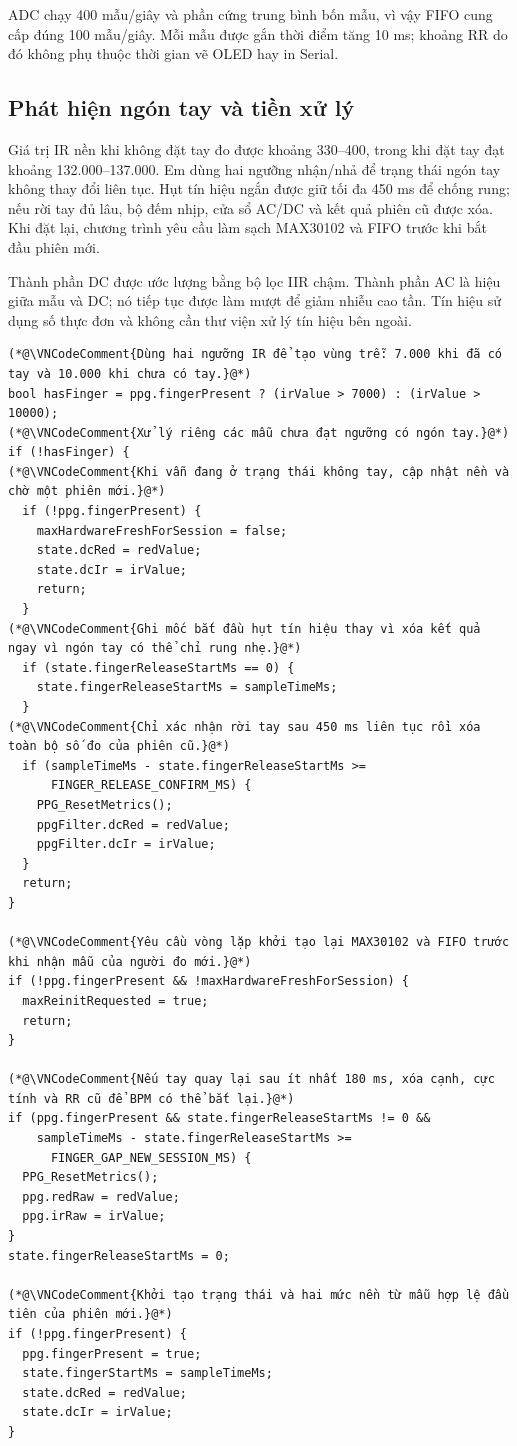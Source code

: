 \documentclass[12pt]{article}
\begin{document}
ADC chạy 400 mẫu/giây và phần cứng trung bình bốn mẫu, vì vậy FIFO cung cấp đúng 100 mẫu/giây. Mỗi mẫu được gắn thời điểm tăng 10 ms; khoảng RR do đó không phụ thuộc thời gian vẽ OLED hay in Serial.

\subsection{Phát hiện ngón tay và tiền xử lý}

Giá trị IR nền khi không đặt tay đo được khoảng 330--400, trong khi đặt tay đạt khoảng 132.000--137.000. Em dùng hai ngưỡng nhận/nhả để trạng thái ngón tay không thay đổi liên tục. Hụt tín hiệu ngắn được giữ tối đa 450 ms để chống rung; nếu rời tay đủ lâu, bộ đếm nhịp, cửa sổ AC/DC và kết quả phiên cũ được xóa. Khi đặt lại, chương trình yêu cầu làm sạch MAX30102 và FIFO trước khi bắt đầu phiên mới.

Thành phần DC được ước lượng bằng bộ lọc IIR chậm. Thành phần AC là hiệu giữa mẫu và DC; nó tiếp tục được làm mượt để giảm nhiễu cao tần. Tín hiệu sử dụng số thực đơn và không cần thư viện xử lý tín hiệu bên ngoài.

\Needspace{0.38\textheight}
\begin{lstlisting}[style=firmware,caption={Ngưỡng trễ, xác nhận rời tay và khởi tạo phiên đo mới}]
(*@\VNCodeComment{Dùng hai ngưỡng IR để tạo vùng trễ: 7.000 khi đã có tay và 10.000 khi chưa có tay.}@*)
bool hasFinger = ppg.fingerPresent ? (irValue > 7000) : (irValue > 10000);
(*@\VNCodeComment{Xử lý riêng các mẫu chưa đạt ngưỡng có ngón tay.}@*)
if (!hasFinger) {
(*@\VNCodeComment{Khi vẫn đang ở trạng thái không tay, cập nhật nền và chờ một phiên mới.}@*)
  if (!ppg.fingerPresent) {
    maxHardwareFreshForSession = false;
    state.dcRed = redValue;
    state.dcIr = irValue;
    return;
  }
(*@\VNCodeComment{Ghi mốc bắt đầu hụt tín hiệu thay vì xóa kết quả ngay vì ngón tay có thể chỉ rung nhẹ.}@*)
  if (state.fingerReleaseStartMs == 0) {
    state.fingerReleaseStartMs = sampleTimeMs;
  }
(*@\VNCodeComment{Chỉ xác nhận rời tay sau 450 ms liên tục rồi xóa toàn bộ số đo của phiên cũ.}@*)
  if (sampleTimeMs - state.fingerReleaseStartMs >=
      FINGER_RELEASE_CONFIRM_MS) {
    PPG_ResetMetrics();
    ppgFilter.dcRed = redValue;
    ppgFilter.dcIr = irValue;
  }
  return;
}

(*@\VNCodeComment{Yêu cầu vòng lặp khởi tạo lại MAX30102 và FIFO trước khi nhận mẫu của người đo mới.}@*)
if (!ppg.fingerPresent && !maxHardwareFreshForSession) {
  maxReinitRequested = true;
  return;
}

(*@\VNCodeComment{Nếu tay quay lại sau ít nhất 180 ms, xóa cạnh, cực tính và RR cũ để BPM có thể bắt lại.}@*)
if (ppg.fingerPresent && state.fingerReleaseStartMs != 0 &&
    sampleTimeMs - state.fingerReleaseStartMs >=
      FINGER_GAP_NEW_SESSION_MS) {
  PPG_ResetMetrics();
  ppg.redRaw = redValue;
  ppg.irRaw = irValue;
}
state.fingerReleaseStartMs = 0;

(*@\VNCodeComment{Khởi tạo trạng thái và hai mức nền từ mẫu hợp lệ đầu tiên của phiên mới.}@*)
if (!ppg.fingerPresent) {
  ppg.fingerPresent = true;
  state.fingerStartMs = sampleTimeMs;
  state.dcRed = redValue;
  state.dcIr = irValue;
}
\end{lstlisting}
\end{document}
